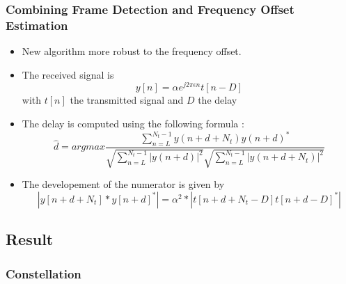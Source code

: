 \documentclass[11pt]{beamer}
\begin{document}
\begin{frame}
\frametitle{Combining Frame Detection and Frequency Offset Estimation}
\begin{itemize}
\item New algorithm more robust to the frequency offset.
\item The received signal is 
\begin{equation}
y[n] = \alpha e^{j2\pi \epsilon n}t[n-D]
\end{equation}
with $t[n]$ the transmitted signal and $D$ the delay
\item The delay is computed using the following formula : 
\begin{equation}
\hat{d}=argmax \frac{\sum_{n=L}^{N_t-1} y(n+d+N_t)y(n+d)^*}{\sqrt{\sum_{n=L}^{N_t-1} |y(n+d)|^2}\sqrt{\sum_{n=L}^{N_t-1} |y(n+d+N_t)|^2}}
\end{equation}
\item The developement of the numerator is given by
\begin{equation}
|y[n+d+N_t]*y[n+d]^*| = \alpha^2*|t[n+d+N_t-D]t[n+d-D]^*|
\end{equation}
\end{itemize}
\end{frame}

\subsection{Result}
\subsubsection{Constellation}
\end{document}
